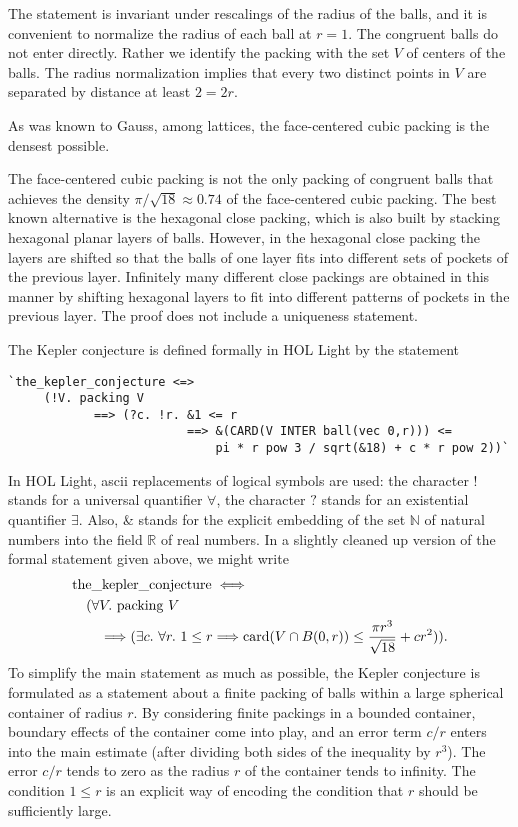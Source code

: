 \documentclass{amsart}
\newcommand{\ring}[1]{\mathbb{#1}}
\newcommand{\op}[1]{\hbox{#1}}
\begin{document}
The statement is invariant under rescalings of the radius of the balls,
and it is convenient to normalize the radius of each ball at $r=1$.
The congruent balls do not enter directly. Rather we identify the packing
with the set $V$ of centers of the balls.  The radius normalization implies
that every two distinct points in $V$ are separated by distance at least
$2 = 2r$.

As was known to Gauss, among lattices, the face-centered cubic packing
is the densest possible.

The face-centered cubic packing is not the only packing of congruent
balls that achieves the density $\pi/\sqrt{18} \approx 0.74$ of the
face-centered cubic packing.  The best known alternative is the
hexagonal close packing, which is also built by stacking hexagonal
planar layers of balls.  However, in the hexagonal close packing the
layers are shifted so that the balls of one layer fits into different
sets of pockets of the previous layer.  Infinitely many different
close packings are obtained in this manner by shifting hexagonal
layers to fit into different patterns of pockets in the previous
layer.  The proof does not include a uniqueness statement.

The Kepler conjecture is defined formally in HOL Light by the statement
\begin{verbatim}
`the_kepler_conjecture <=>
     (!V. packing V
            ==> (?c. !r. &1 <= r
                         ==> &(CARD(V INTER ball(vec 0,r))) <=
                             pi * r pow 3 / sqrt(&18) + c * r pow 2))`
\end{verbatim}
In HOL Light, ascii replacements of logical symbols are used:
the character $!$ stands for a universal quantifier $\forall$,
the character $?$ stands for an existential quantifier $\exists$.
Also, \& stands for the explicit embedding of the set $\ring{N}$ of natural
numbers into the field $\ring{R}$ of real numbers.  In a slightly
cleaned up version of the formal statement given above, we might write
\begin{align*}
&\op{the\_kepler\_conjecture} \iff\\
&\quad (\forall V.\ \op{packing}\ V\\
&\quad\quad \Longrightarrow (\exists c.\ \forall r.\ 1 \le r \Longrightarrow
\op{card}(V \cap B(0,r)) \le
\frac{\pi r^3}{\sqrt{18}} + c r^2)).
\end{align*}
To simplify the main statement as much as possible, the Kepler
conjecture is formulated as a statement about a finite
packing of balls within a large spherical container of radius $r$.  By
considering finite packings in a bounded container, boundary effects
of the container come into play, and an error term $c/r$ enters into
the main estimate (after dividing both sides of the inequality by $r^3$).  
The error $c/r$ tends to zero as the radius $r$ of
the container tends to infinity.
The condition $1\le r$ is an explicit way of encoding the
condition that $r$ should be sufficiently large.  
\end{document}
